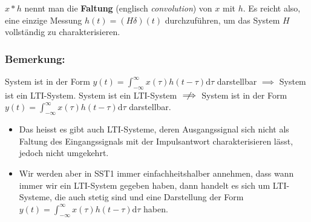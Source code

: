 \documentclass[11pt]{article}
\begin{document}
\vspace*{-0.5cm}


\vfill \null
\pagebreak

%

$x \ast h$ nennt man die \textbf{Faltung} (englisch \textit{convolution}) von $x$ mit $h$. Es reicht also, eine einzige Messung $h(t) = (H \delta)(t)$ durchzuführen, um das System $H$ vollständig zu charakterisieren.

\vspace*{-0.5cm}
\subsubsection*{Bemerkung:}
\vspace*{-0.5cm}
System ist in der Form $y(t) = \displaystyle\int_{-\infty}^{\infty} x(\tau) h(t-\tau) \text{d}\tau$ darstellbar $\implies$ System ist ein LTI-System.
System ist ein LTI-System $\centernot{\implies}$ System ist in der Form $y(t) = \displaystyle\int_{-\infty}^{\infty} x(\tau) h(t-\tau) \text{d}\tau$ darstellbar.
\vspace*{-0.5cm}
\begin{itemize}[leftmargin=0pt]
    \item[] Das heisst es gibt auch LTI-Systeme, deren Ausgangssignal sich nicht als Faltung des Eingangssignals mit der Impulsantwort charakterisieren lässt, jedoch nicht umgekehrt.
    \item[] Wir werden aber in SST1 immer einfachheitshalber annehmen, dass wann immer wir ein LTI-System gegeben haben, dann handelt es sich um LTI-Systeme, die auch stetig sind und eine Darstellung der Form $y(t) = \displaystyle\int_{-\infty}^{\infty} x(\tau) h(t-\tau) \text{d}\tau$ haben.
\end{itemize}

\vspace*{-0.5cm}
\end{document}
